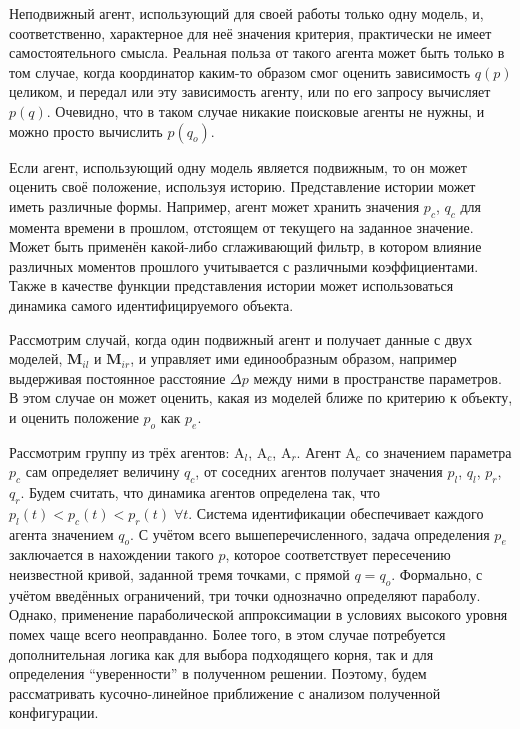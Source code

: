 Неподвижный агент, использующий для своей работы только одну модель,
и, соответственно, характерное для неё значения критерия,
практически не имеет самостоятельного смысла. Реальная польза от такого агента
может быть только в том случае, когда координатор
каким-то образом смог оценить зависимость $q(p)$ целиком,
и передал или эту зависимость агенту, или по его запросу вычисляет $p(q)$.
Очевидно, что в таком случае никакие поисковые агенты не нужны,
и можно просто вычислить $p(q_o)$.

Если агент, использующий одну модель является подвижным,
то он может оценить своё положение, используя историю.
Представление истории может иметь различные формы.
Например, агент может хранить значения $p_c$, $q_c$
для момента времени в прошлом, отстоящем от текущего
на заданное значение. Может быть применён какой-либо
сглаживающий фильтр, в котором влияние различных моментов прошлого учитывается
с различными коэффициентами. Также в качестве функции
представления истории может использоваться
динамика самого идентифицируемого объекта.

Рассмотрим случай, когда один подвижный агент и получает данные с двух моделей,
$ \mathbf{M}_{il}$ и
$ \mathbf{M}_{ir}$,
и управляет ими единообразным образом, например
выдерживая постоянное расстояние $\Delta p$ между ними в пространстве параметров.
В этом случае он может оценить, какая из моделей ближе по критерию
к объекту, и оценить положение $p_o$ как $p_e$.

Рассмотрим группу из трёх агентов:
$\mathrm{A}_l$,
$\mathrm{A}_c$,
$\mathrm{A}_r$.
Агент $\mathrm{A}_c$ со значением параметра $p_c$
сам определяет величину $q_c$,
от соседних агентов получает значения
$p_l$, $q_l$, $p_r$, $q_r$.
Будем считать, что динамика агентов определена так,
что $p_l(t) < p_c(t) < p_r(t) \; \forall t$.
Система идентификации обеспечивает каждого
агента значением $q_o$. С учётом всего вышеперечисленного,
задача определения $p_e$ заключается в нахождении такого $p$,
которое соответствует пересечению неизвестной кривой,
заданной тремя точками, с прямой $q=q_o$.
Формально, с учётом введённых ограничений,
три точки однозначно определяют параболу.
Однако, применение параболической аппроксимации в условиях
высокого уровня помех чаще всего неоправданно. Более того,
в этом случае потребуется дополнительная логика как для
выбора подходящего корня, так и для определения
``уверенности'' в полученном решении. Поэтому, будем рассматривать
кусочно-линейное приближение с анализом полученной конфигурации.

